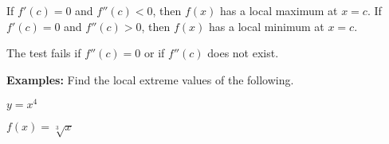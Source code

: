 \newpage


\begin{tcolorbox}[title= THE SECOND DERIVATIVE TEST,colframe=black,sharp corners,colback=white,colbacktitle=white,coltitle=black,boxrule=1pt]

    \begin{questions}
        \question If $f'(c)=0$ and $f''(c)<0$, then $f(x)$ has a local maximum at $x=c$.
        \question If $f'(c)=0$ and $f''(c)>0$, then $f(x)$ has a local minimum at $x=c$.
    \end{questions}
    
    The test fails if $f''(c)=0$ or if $f''(c)$ does not exist.
    
\end{tcolorbox}

\textbf{Examples:} Find the local extreme values of the following.
\begin{questions}
    \begin{minipage}{.45\linewidth}
        \question $y=x^4$
    \end{minipage}
    \hfill
    \begin{minipage}{.45\linewidth}
        \question $f(x)=\sqrt[3]{x}$
    \end{minipage}

\end{questions}

